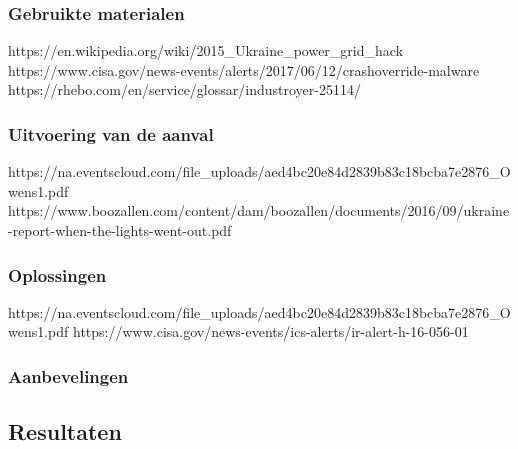 \subsubsection{Gebruikte materialen}
https://en.wikipedia.org/wiki/2015_Ukraine_power_grid_hack
https://www.cisa.gov/news-events/alerts/2017/06/12/crashoverride-malware
https://rhebo.com/en/service/glossar/industroyer-25114/


\subsubsection{Uitvoering van de aanval}
https://na.eventscloud.com/file_uploads/aed4bc20e84d2839b83c18bcba7e2876_Owens1.pdf
https://www.boozallen.com/content/dam/boozallen/documents/2016/09/ukraine-report-when-the-lights-went-out.pdf
\subsubsection{Oplossingen}
https://na.eventscloud.com/file_uploads/aed4bc20e84d2839b83c18bcba7e2876_Owens1.pdf
https://www.cisa.gov/news-events/ics-alerts/ir-alert-h-16-056-01
\subsubsection{Aanbevelingen}

\subsection{Resultaten}
